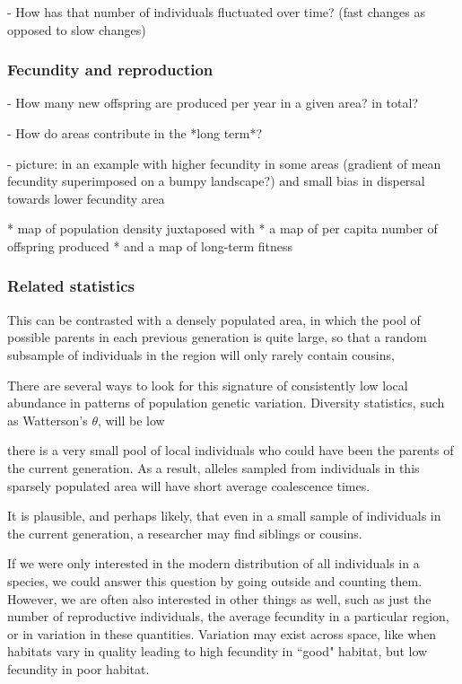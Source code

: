 \documentclass{ar-1col}
\begin{document}
        - How has that number of individuals fluctuated over time? (fast changes as opposed to slow changes)

\subsubsection{Fecundity and reproduction}
        - How many new offspring are produced per year in a given area? in total?

        - How do areas contribute in the *long term*?

        - picture: 
            in an example with higher fecundity in some areas 
            (gradient of mean fecundity superimposed on a bumpy landscape?)
            and small bias in dispersal towards lower fecundity area

            * map of population density juxtaposed with
            * a map of per capita number of offspring produced
            * and a map of long-term fitness 
            
\subsubsection{Related statistics}

This can be contrasted with a densely populated area, 
in which the pool of possible parents in each previous generation is quite large, 
so that a random subsample of individuals in the region 
will only rarely contain cousins, 




There are several ways to look for this signature 
of consistently low local abundance 
in patterns of population genetic variation.
Diversity statistics, such as Watterson's $\theta$, 
will be low



there is a very small pool of local individuals who could 
have been the parents of the current generation.
As a result, alleles sampled from individuals in this sparsely populated area 
will have short average coalescence times.


It is plausible, and perhaps likely,
that even in a small sample of individuals in the current generation, 
a researcher may find siblings or cousins.

If we were only interested in 
the modern distribution of all individuals in a species, 
we could answer this question by going outside and counting them.
However, we are often also interested in other things as well, 
such as just the number of reproductive individuals, 
the average fecundity in a particular region, 
or in variation in these quantities.
Variation may exist across space,
like when habitats vary in quality
leading to high fecundity in ``good" habitat, 
but low fecundity in poor habitat.
\end{document}
